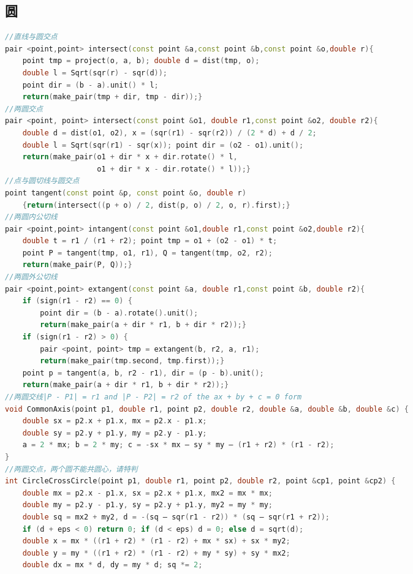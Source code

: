 \documentclass[landscape,a4paper]{article}
\begin{document}
\begin{spacing}{0.3}
\begin{multicols}{3}
\subsection{圆}
\begin{lstlisting}[language=C++]
//直线与圆交点
pair <point,point> intersect(const point &a,const point &b,const point &o,double r){
    point tmp = project(o, a, b); double d = dist(tmp, o);
    double l = Sqrt(sqr(r) - sqr(d));
    point dir = (b - a).unit() * l;
    return(make_pair(tmp + dir, tmp - dir));}
//两圆交点
pair <point, point> intersect(const point &o1, double r1,const point &o2, double r2){
    double d = dist(o1, o2), x = (sqr(r1) - sqr(r2)) / (2 * d) + d / 2;
    double l = Sqrt(sqr(r1) - sqr(x)); point dir = (o2 - o1).unit();
    return(make_pair(o1 + dir * x + dir.rotate() * l,
                     o1 + dir * x - dir.rotate() * l));}
//点与圆切线与圆交点
point tangent(const point &p, const point &o, double r)
    {return(intersect((p + o) / 2, dist(p, o) / 2, o, r).first);}
//两圆内公切线
pair <point,point> intangent(const point &o1,double r1,const point &o2,double r2){
    double t = r1 / (r1 + r2); point tmp = o1 + (o2 - o1) * t;
    point P = tangent(tmp, o1, r1), Q = tangent(tmp, o2, r2);
    return(make_pair(P, Q));}
//两圆外公切线
pair <point,point> extangent(const point &a, double r1,const point &b, double r2){
    if (sign(r1 - r2) == 0) {
        point dir = (b - a).rotate().unit();
        return(make_pair(a + dir * r1, b + dir * r2));}
    if (sign(r1 - r2) > 0) {
		pair <point, point> tmp = extangent(b, r2, a, r1);
        return(make_pair(tmp.second, tmp.first));}
    point p = tangent(a, b, r2 - r1), dir = (p - b).unit();
    return(make_pair(a + dir * r1, b + dir * r2));}
//两圆交线|P - P1| = r1 and |P - P2| = r2 of the ax + by + c = 0 form
void CommonAxis(point p1, double r1, point p2, double r2, double &a, double &b, double &c) {
	double sx = p2.x + p1.x, mx = p2.x - p1.x;
	double sy = p2.y + p1.y, my = p2.y - p1.y;
	a = 2 * mx; b = 2 * my; c = -sx * mx – sy * my – (r1 + r2) * (r1 - r2);
}
//两圆交点，两个圆不能共圆心，请特判
int CircleCrossCircle(point p1, double r1, point p2, double r2, point &cp1, point &cp2) {
	double mx = p2.x - p1.x, sx = p2.x + p1.x, mx2 = mx * mx;
	double my = p2.y - p1.y, sy = p2.y + p1.y, my2 = my * my;
	double sq = mx2 + my2, d = -(sq – sqr(r1 - r2)) * (sq – sqr(r1 + r2));
	if (d + eps < 0) return 0; if (d < eps) d = 0; else d = sqrt(d);
	double x = mx * ((r1 + r2) * (r1 - r2) + mx * sx) + sx * my2;
	double y = my * ((r1 + r2) * (r1 - r2) + my * sy) + sy * mx2;
	double dx = mx * d, dy = my * d; sq *= 2;

\end{lstlisting}
\end{multicols}
\end{spacing}
\end{document}
